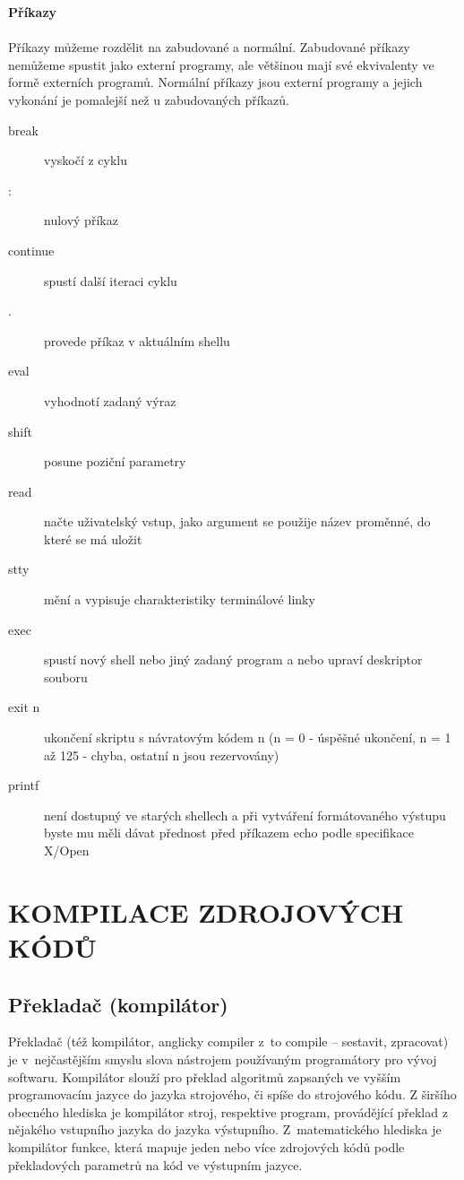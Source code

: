 \documentclass[a4paper,12pt]{article}
\newcommand{\sectionV}[1]{\section{\uppercase{#1}}}	%
\newcommand{\nadpis}[1]{%
	\vspace{4 mm}
	\textbf{#1}\\
	\vspace{4 mm}
	}
\begin{document}
\nadpis{Příkazy}\\
Příkazy můžeme rozdělit na zabudované a normální. Zabudované příkazy nemůžeme spustit jako externí programy, ale většinou mají své ekvivalenty ve formě externích programů. Normální příkazy jsou externí programy a jejich vykonání je pomalejší než u zabudovaných příkazů\cite{ABC_SBASH}.
\begin{description}
 \item[break] vyskočí z cyklu
 \item[:] nulový příkaz
 \item[continue] spustí další iteraci cyklu
 \item[.] provede příkaz v aktuálním shellu
 \item[eval] vyhodnotí zadaný výraz
 \item[shift] posune poziční parametry
 \item[read] načte uživatelský vstup, jako argument se použije název proměnné, do které se má uložit
 \item[stty] mění a vypisuje charakteristiky terminálové linky
 \item[exec] spustí nový shell nebo jiný zadaný program a nebo upraví deskriptor souboru
 \item[exit n] ukončení skriptu s návratovým kódem n (n = 0 - úspěšné ukončení, n = 1 až 125 - chyba, ostatní n jsou rezervovány)
 \item[printf] není dostupný ve starých shellech a při vytváření formátovaného výstupu byste mu měli dávat přednost před příkazem echo podle specifikace X/Open
 \end{description}





\sectionV{Kompilace zdrojových kódů}
\subsection{Překladač (kompilátor)}
Překladač (též kompilátor, anglicky compiler z~to compile – sestavit, zpracovat) je v~nejčastějším smyslu slova nástrojem používaným programátory pro vývoj softwaru. Kompilátor slouží pro překlad algoritmů zapsaných ve vyšším programovacím jazyce do jazyka strojového, či spíše do strojového kódu. Z širšího obecného hlediska je kompilátor stroj, respektive program, provádějící překlad z nějakého vstupního jazyka do jazyka výstupního. Z~matematického hlediska je kompilátor funkce, která mapuje jeden nebo více zdrojových kódů podle překladových parametrů na kód ve výstupním jazyce.~\cite{Wkom}
\end{document}
